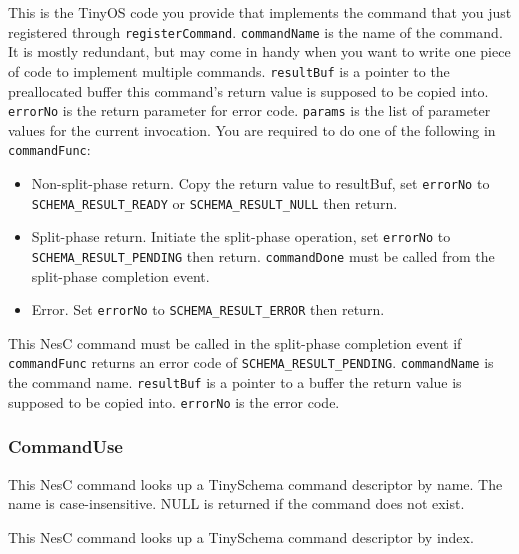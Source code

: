 \documentclass[11pt]{article}
\begin{document}
This is the TinyOS code you provide that implements the command
that you just registered through {\tt registerCommand}.
{\tt commandName} is the name of the command.  It is mostly redundant, but may
come in handy when you want to write one piece of code to implement
multiple commands.  {\tt resultBuf} is a pointer to the preallocated buffer
this command's return value is supposed to be copied into.
{\tt errorNo} is the return parameter for error code.  {\tt params} is
the list of parameter values for the current invocation.
You are required to do one of the following in {\tt commandFunc}:
\begin{itemize}
\item Non-split-phase return.  Copy the return value to resultBuf, 
set {\tt *errorNo}
to {\tt SCHEMA\_RESULT\_READY} or {\tt SCHEMA\_RESULT\_NULL} then return.
\item Split-phase return.  Initiate the split-phase operation,
set {\tt *errorNo}
to {\tt SCHEMA\_RESULT\_PENDING} then return.  
{\tt commandDone} must be called
from the split-phase completion event.
\item Error.  Set {\tt *errorNo} to {\tt SCHEMA\_RESULT\_ERROR} then return.
\end{itemize}



This NesC command must be called in the split-phase completion event if
{\tt commandFunc} returns an error code of {\tt SCHEMA\_RESULT\_PENDING}.
{\tt commandName} is the command name.  {\tt resultBuf} is a pointer to
a buffer the return value is supposed to be copied into.
{\tt errorNo} is the error code.

\subsubsection{CommandUse}


This NesC command looks up a TinySchema command descriptor by name.  The name
is case-insensitive.  NULL is returned
if the command does not exist.



This NesC command looks up a TinySchema command descriptor by index.


\end{document}
